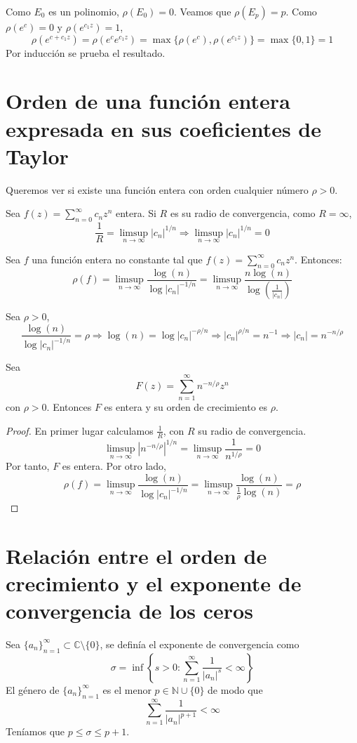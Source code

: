 Como $E_0$ es un polinomio, $\rho(E_0) = 0$.
Veamos que $\rho(E_p) = p$.
Como $\rho(e^c) = 0$ y $\rho(e^{c_1z}) = 1$,
$$\rho(e^{c+c_1z}) = \rho(e^ce^{c_1z}) = \max\{\rho(e^c), \rho(e^{c_1z})\} = \max\{0, 1\} = 1$$
Por inducción se prueba el resultado.

\section{Orden de una función entera expresada en sus coeficientes de Taylor}
Queremos ver si existe una función entera con orden cualquier número $\rho > 0$.

Sea $f(z) = \sum_{n=0}^\infty c_nz^n$ entera.
Si $R$ es su radio de convergencia, como $R = \infty$,
$$\frac{1}{R} = \limsup_{n \to \infty} |c_n|^{1/n} \Rightarrow \limsup_{n \to \infty} |c_n|^{1/n} = 0$$

\begin{theorem}
    Sea $f$ una función entera no constante tal que $f(z) = \sum_{n=0}^\infty c_nz^n$.
    Entonces:
    $$\rho(f) = \limsup_{n \to \infty} \frac{\log(n)}{\log|c_n|^{-1/n}} = \limsup_{n \to \infty} \frac{n\log(n)}{\log\left(\frac{1}{|c_n|}\right)}$$
\end{theorem}


Sea $\rho > 0$,
$$\frac{\log(n)}{\log|c_n|^{-1/n}} = \rho \Rightarrow \log(n) = \log|c_n|^{-\rho/n} \Rightarrow |c_n|^{\rho/n} = n^{-1} \Rightarrow |c_n| = n^{-n/\rho}$$

\begin{corollary}
    Sea
    $$F(z) = \sum_{n=1}^\infty n^{-n/\rho}z^n$$
    con $\rho > 0$.
    Entonces $F$ es entera y su orden de crecimiento es $\rho$.
\end{corollary}

\begin{proof}
    En primer lugar calculamos $\frac{1}{R}$, con $R$ su radio de convergencia.
    $$\limsup_{n \to \infty} |n^{-n/\rho}|^{1/n} = \limsup_{n \to \infty} \frac{1}{n^{1/\rho}} = 0$$
    Por tanto, $F$ es entera.
    Por otro lado,
    $$\rho(f) = \limsup_{n \to \infty} \frac{\log(n)}{\log|c_n|^{-1/n}} = \limsup_{n \to \infty} \frac{\log(n)}{\frac{1}{\rho}\log(n)} = \rho$$
\end{proof}

\section{Relación entre el orden de crecimiento y el exponente de convergencia de los ceros}
Sea $\{a_n\}_{n=1}^\infty \subset \mathbb{C} \setminus \{0\}$, se definía el exponente de convergencia como
$$\sigma = \inf\left\{s > 0 : \sum_{n=1}^\infty \frac{1}{|a_n|^s} < \infty\right\}$$
El género de $\{a_n\}_{n=1}^\infty$ es el menor $p \in \mathbb{N} \cup \{0\}$ de modo que
$$\sum_{n=1}^\infty \frac{1}{|a_n|^{p+1}} < \infty$$
Teníamos que $p \leq \sigma \leq p+1$.

